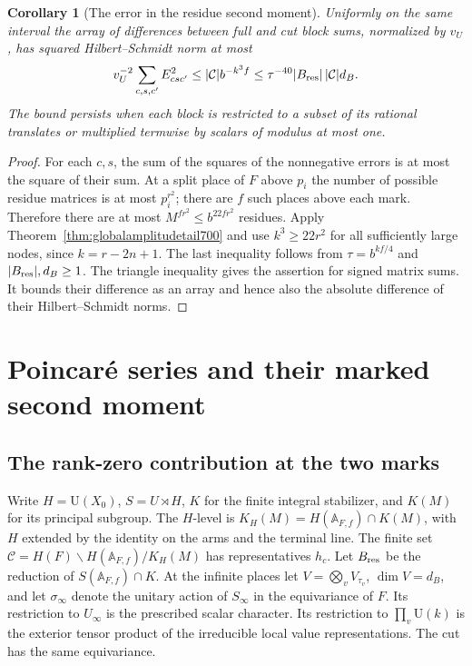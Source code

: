 \documentclass[a4paper,11pt]{article}
\newtheorem{corollary}[proposition]{Corollary}
\theoremstyle{definition}
\theoremstyle{remark}
\numberwithin{equation}{section}
\begin{document}
\begin{corollary}[The error in the residue second moment]\leavevmode
\label{cor:squaredamplitudetail700}
Uniformly on the same interval the array of differences between
full and cut block sums, normalized by \(v_U\), has squared
Hilbert--Schmidt norm at most
\[
  v_U^{-2}\sum_{c,s,c'}E_{csc'}^2
          \le |\mathcal C|b^{-k^3f}
          \le \tau^{-40}|B_{\rm res}|\,|\mathcal C|d_B .
\]
The bound persists when each block is restricted to a subset
of its rational translates or multiplied termwise by scalars
of modulus at most one.
\end{corollary}
\begin{proof}
For each \(c,s\), the sum of the squares of the nonnegative
errors is at most the square of their sum. At a split place of
\(F\) above \(p_i\) the number of possible residue matrices
is at most \(p_i^{r^2}\); there are \(f\) such places above
each mark. Therefore there are at most
\(M^{fr^2}\le b^{22fr^2}\) residues. Apply
Theorem~\ref{thm:globalamplitudetail700} and use
\(k^3\ge22r^2\) for all sufficiently large nodes, since
\(k=r-2n+1\). The last inequality follows from
\(\tau=b^{kf/4}\) and \(|B_{\rm res}|,d_B\ge1\).
The triangle inequality gives the assertion for signed matrix
sums. It bounds their difference as an array and hence also
the absolute difference of their Hilbert--Schmidt norms.
\end{proof}

\section{Poincar\'e series and their marked second moment}\label{nav:poincare-spanning}

\subsection{The rank-zero contribution at the two marks}
\label{sec:besselresidue701}

Write \(H=\mathrm U(X_0)\), \(S=U\rtimes H\), \(K\) for the
finite integral stabilizer, and \(K(M)\) for its principal
subgroup. The \(H\)-level is \(K_H(M)=H(\mathbb A_{F,f})\cap
K(M)\), with \(H\) extended by the identity on the arms and the
terminal line. The finite set
\(\mathcal C=H(F)\backslash H(\mathbb A_{F,f})/K_H(M)\)
has representatives \(h_c\). Let \(B_{\rm res}\) be the reduction
of \(S(\mathbb A_{F,f})\cap K\). At the infinite places let
\(V=\bigotimes_v V_{\tau_v}\), \(\dim V=d_B\), and let
\(\sigma_\infty\) denote the unitary action of \(S_\infty\)
in the equivariance of \(F\). Its restriction to \(U_\infty\)
is the prescribed scalar character. Its restriction to
\(\prod_v\mathrm U(k)\) is the exterior tensor product of the
irreducible local value representations. The cut has the same
equivariance.
\end{document}
